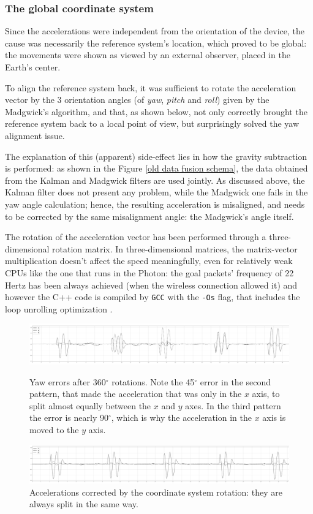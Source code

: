 \subsubsection{The global coordinate system}
Since the accelerations were independent from the orientation of the device, the cause was necessarily the reference system's location, which proved to be global: the movements were shown as viewed by an external observer, placed in the Earth's center.

To align the reference system back, it was sufficient to rotate the acceleration vector by the 3 orientation angles (of \textit{yaw}, \textit{pitch} and \textit{roll}) given by the Madgwick's algorithm, and that, as shown below, not only correctly brought the reference system back to a local point of view, but surprisingly solved the yaw alignment issue.

The explanation of this (apparent) side-effect lies in how the gravity subtraction is performed: as shown in the Figure \ref{old data fusion schema}, the data obtained from the Kalman and Madgwick filters are used jointly. As discussed above, the Kalman filter does not present any problem, while the Madgwick one fails in the yaw angle calculation; hence, the resulting acceleration is misaligned, and needs to be corrected by the same misalignment angle: the Madgwick's angle itself.
\bigbreak

The rotation of the acceleration vector has been performed through a three-dimensional rotation matrix. In three-dimensional matrices, the matrix-vector multiplication doesn't affect the speed meaningfully, even for relatively weak CPUs like the one that runs in the Photon: the goal packets' frequency of 22 Hertz \cite{Pio19} has been always achieved (when the wireless connection allowed it) and however the C++ code is compiled by \texttt{GCC} with the \texttt{-Os} flag, that includes the loop unrolling optimization \cite{UsingGCC}.

\clearpage
\begin{figure}
	\includegraphics[width=\textwidth]{img/plots/drift.png}	
	\caption{Yaw errors after 360$^{\circ}$ rotations. Note the 45$^{\circ}$ error in the second pattern, that made the acceleration that was only in the $x$ axis, to split almost equally between the $x$ and $y$ axes. In the third pattern the error is nearly 90$^{\circ}$, which is why the acceleration in the $x$ axis is moved to the $y$ axis.}
	\bigbreak

	\includegraphics[width=\textwidth]{img/plots/nodrift.png}	
	\caption{Accelerations corrected by the coordinate system rotation: they are always split in the same way.}
\end{figure}
\clearpage

